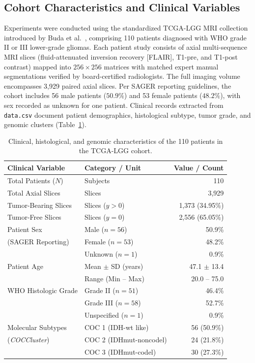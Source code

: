 \documentclass[preprint,3p,times,onecolumn]{elsarticle}
\begin{document}
\subsection{Cohort Characteristics and Clinical Variables}
Experiments were conducted using the standardized TCGA-LGG MRI collection introduced by Buda et al.~\cite{buda2019association}, comprising 110 patients diagnosed with WHO grade II or III lower-grade gliomas. Each patient study consists of axial multi-sequence MRI slices (fluid-attenuated inversion recovery [FLAIR], T1-pre, and T1-post contrast) mapped into $256 \times 256$ matrices with matched expert manual segmentations verified by board-certified radiologists. The full imaging volume encompasses 3,929 paired axial slices. Per SAGER reporting guidelines, the cohort includes 56 male patients ($50.9\%$) and 53 female patients ($48.2\%$), with sex recorded as unknown for one patient. Clinical records extracted from \texttt{data.csv} document patient demographics, histological subtype, tumor grade, and genomic clusters (Table~\ref{tab:clinical_cohort}).

\begin{table}[tbp]
\centering
\caption{Clinical, histological, and genomic characteristics of the 110 patients in the TCGA-LGG cohort.}
\label{tab:clinical_cohort}
\setlength{\tabcolsep}{8pt}
\small
\begin{tabular*}{\textwidth}{@{\extracolsep{\fill}}llr}
\toprule
\textbf{Clinical Variable} & \textbf{Category / Unit} & \textbf{Value / Count} \\
\midrule
Total Patients ($N$) & Subjects & 110 \\
Total Axial Slices & Slices & 3,929 \\
Tumor-Bearing Slices & Slices ($y > 0$) & 1,373 (34.95\%) \\
Tumor-Free Slices & Slices ($y = 0$) & 2,556 (65.05\%) \\
\midrule
\midrule
Patient Sex & Male ($n=56$) & 50.9\% \\
(SAGER Reporting) & Female ($n=53$) & 48.2\% \\
 & Unknown ($n=1$) & 0.9\% \\
Patient Age & Mean $\pm$ SD (years) & 47.1 $\pm$ 13.4 \\
& Range (Min -- Max) & 20.0 -- 75.0 \\
\midrule
WHO Histologic Grade & Grade II ($n=51$) & 46.4\% \\
& Grade III ($n=58$) & 52.7\% \\
& Unspecified ($n=1$) & 0.9\% \\
\midrule
Molecular Subtypes & COC 1 (IDH-wt like) & 56 (50.9\%) \\
(\textit{COCCluster}) & COC 2 (IDHmut-noncodel) & 24 (21.8\%) \\
& COC 3 (IDHmut-codel) & 30 (27.3\%) \\
\bottomrule
\end{tabular*}
\end{table}
\end{document}
